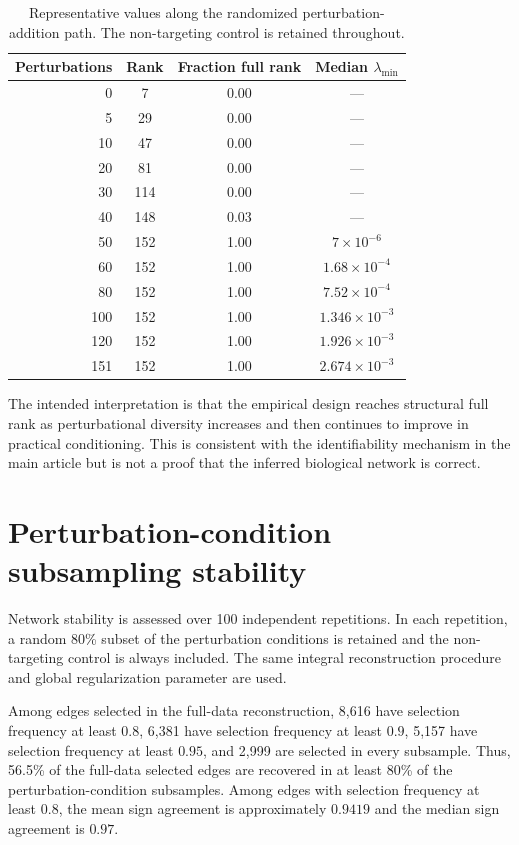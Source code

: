 \documentclass[supplement,onefignum,onetabnum]{siamart251216}
\begin{document}
\begin{table}[htbp]
\footnotesize
\caption{Representative values along the randomized perturbation-addition path. The non-targeting control is retained throughout.}
\label{tab:identifiability-path}
\begin{center}
\begin{tabular}{rccc}
\toprule
Perturbations & Rank & Fraction full rank & Median \(\lambda_{\min}\) \\
\midrule
0   & 7   & 0.00 & --- \\
5   & 29  & 0.00 & --- \\
10  & 47  & 0.00 & --- \\
20  & 81  & 0.00 & --- \\
30  & 114 & 0.00 & --- \\
40  & 148 & 0.03 & --- \\
50  & 152 & 1.00 & \(7\times10^{-6}\) \\
60  & 152 & 1.00 & \(1.68\times10^{-4}\) \\
80  & 152 & 1.00 & \(7.52\times10^{-4}\) \\
100 & 152 & 1.00 & \(1.346\times10^{-3}\) \\
120 & 152 & 1.00 & \(1.926\times10^{-3}\) \\
151 & 152 & 1.00 & \(2.674\times10^{-3}\) \\
\bottomrule
\end{tabular}
\end{center}
\end{table}

The intended interpretation is that the empirical design reaches structural full rank as perturbational diversity increases and then continues to improve in practical conditioning. This is consistent with the identifiability mechanism in the main article but is not a proof that the inferred biological network is correct.

\section{Perturbation-condition subsampling stability}

Network stability is assessed over 100 independent repetitions. In each repetition, a random 80\% subset of the perturbation conditions is retained and the non-targeting control is always included. The same integral reconstruction procedure and global regularization parameter are used.

Among edges selected in the full-data reconstruction, 8,616 have selection frequency at least \(0.8\), 6,381 have selection frequency at least \(0.9\), 5,157 have selection frequency at least \(0.95\), and 2,999 are selected in every subsample. Thus, 56.5\% of the full-data selected edges are recovered in at least 80\% of the perturbation-condition subsamples. Among edges with selection frequency at least \(0.8\), the mean sign agreement is approximately \(0.9419\) and the median sign agreement is \(0.97\).
\end{document}
